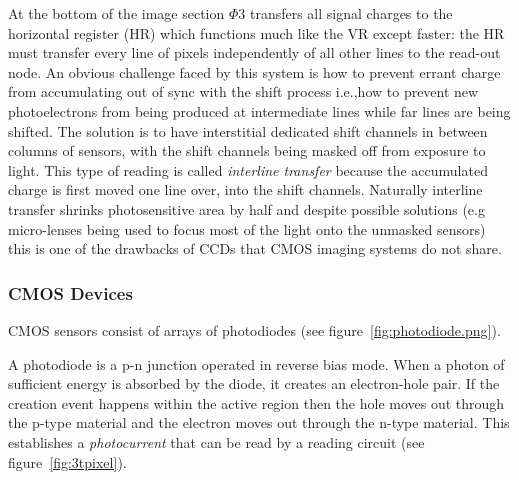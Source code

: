 At the bottom of the image section \(\Phi3\) transfers all signal charges to the horizontal register (HR) which functions much like the VR except faster: the HR must transfer every line of pixels independently of all other lines to the read-out node.
%
An obvious challenge faced by this system is how to prevent errant charge from accumulating out of sync with the shift process i.e.,how to prevent new photoelectrons from being produced at intermediate lines while far lines are being shifted.
%
The solution is to have interstitial dedicated shift channels in between columns of sensors, with the shift channels being masked off from exposure to light.
%
This type of reading is called \textit{interline transfer} because the accumulated charge is first moved one line over, into the shift channels.
%
Naturally interline transfer shrinks photosensitive area by half and despite possible solutions (e.g micro-lenses being used to focus most of the light onto the unmasked sensors) this is one of the drawbacks of CCDs that CMOS imaging systems do not share.
\subsubsection{CMOS Devices}
CMOS sensors consist of arrays of photodiodes (see figure~\ref{fig:photodiode.png}).

A photodiode is a p-n junction operated in reverse bias mode.
%
When a photon of sufficient energy is absorbed by the diode, it creates an electron-hole pair.
%
If the creation event happens within the active region then the hole moves out through the p-type material and the electron moves out through the n-type material.
%
This establishes a \textit{photocurrent} that can be read by a reading circuit (see figure~\ref{fig:3tpixel}).

